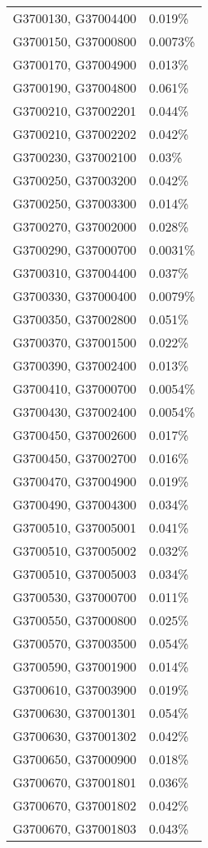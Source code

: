\begin{longtable}[]{@{}ll@{}}
G3700130, G37004400 & 0.019\% \\
G3700150, G37000800 & 0.0073\% \\
G3700170, G37004900 & 0.013\% \\
G3700190, G37004800 & 0.061\% \\
G3700210, G37002201 & 0.044\% \\
G3700210, G37002202 & 0.042\% \\
G3700230, G37002100 & 0.03\% \\
G3700250, G37003200 & 0.042\% \\
G3700250, G37003300 & 0.014\% \\
G3700270, G37002000 & 0.028\% \\
G3700290, G37000700 & 0.0031\% \\
G3700310, G37004400 & 0.037\% \\
G3700330, G37000400 & 0.0079\% \\
G3700350, G37002800 & 0.051\% \\
G3700370, G37001500 & 0.022\% \\
G3700390, G37002400 & 0.013\% \\
G3700410, G37000700 & 0.0054\% \\
G3700430, G37002400 & 0.0054\% \\
G3700450, G37002600 & 0.017\% \\
G3700450, G37002700 & 0.016\% \\
G3700470, G37004900 & 0.019\% \\
G3700490, G37004300 & 0.034\% \\
G3700510, G37005001 & 0.041\% \\
G3700510, G37005002 & 0.032\% \\
G3700510, G37005003 & 0.034\% \\
G3700530, G37000700 & 0.011\% \\
G3700550, G37000800 & 0.025\% \\
G3700570, G37003500 & 0.054\% \\
G3700590, G37001900 & 0.014\% \\
G3700610, G37003900 & 0.019\% \\
G3700630, G37001301 & 0.054\% \\
G3700630, G37001302 & 0.042\% \\
G3700650, G37000900 & 0.018\% \\
G3700670, G37001801 & 0.036\% \\
G3700670, G37001802 & 0.042\% \\
G3700670, G37001803 & 0.043\% \\

\end{longtable}
